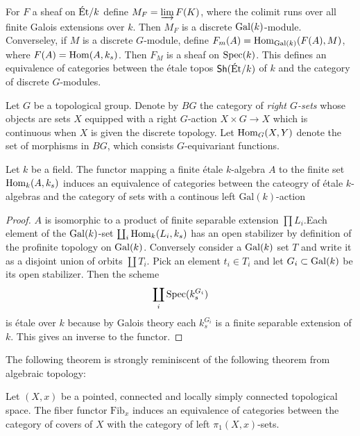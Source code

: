 For $F$ a sheaf on $\text{\'Et}/k$ define $M_F = \varinjlim F(K)$, where the colimit runs over all finite Galois extensions over $k$. Then $M_F$ is a discrete $\operatorname{Gal}(k)$-module. Converseley, if $M$ is a discrete $G$-module, define $F_m(A) = \operatorname{Hom}_{\operatorname{Gal}(k)}(F(A),M)$, where $F(A) = \operatorname{Hom}(A, k_s)$. Then $F_M$ is a sheaf on $\operatorname{Spec}(k)$. This defines an equivalence of categories between the \'etale topos $\operatorname{\mathsf{Sh}}(\text{\'Et}/k)$ of $k$ and the category of discrete $G$-modules.

\begin{construction}
	Let $G$ be a topological group. Denote by $BG$ the category of \textit{right $G$-sets} whose objects are sets $X$ equipped with a right $G$-action $X \times G \to X$ which is continuous when $X$ is given the discrete topology. Let $\operatorname{Hom}_G(X,Y)$ denote the set of morphisms in $BG$, which consists $G$-equivariant functions.
\end{construction}



\begin{definition}

\end{definition}

\begin{theorem}\label{theorem:galois}
	Let $k$ be a field. The functor mapping a finite \'etale $k$-algebra $A$ to the finite set $\operatorname{Hom}_k(A, k_s)$ induces an equivalence of categories between the cateogry of \'etale $k$-algebras and the category of sets with a continous left $\text{Gal}(k)$-action
\end{theorem}

\begin{proof}
	$A$ is isomorphic to a product of finite separable extension $\prod L_i$.Each element of the $\operatorname{Gal}(k)$-set $\coprod_i \operatorname{Hom}_k(L_i, k_s)$ has an open stabilizer by definition of the profinite topology on $\operatorname{Gal}(k)$. Conversely consider a $\operatorname{Gal}(k)$ set $T$ and write it as a disjoint union of orbits $\coprod T_i$. Pick an element $t_i \in T_i$ and let $G_i \subset \operatorname{Gal}(k)$ be its open stabilizer. Then the scheme
	\[
		\coprod_i \operatorname{Spec}(k_s^{G_i})
	\]
	is \'etale over $k$ because by Galois theory each $k_s^{G_i}$ is a finite separable extension of $k$. This gives an inverse to the functor.
\end{proof}

The following theorem is strongly reminiscent of the following theorem from algebraic topology:

\begin{theorem}
	Let $(X,x)$ be a pointed, connected and locally simply connected topological space. The fiber functor $\text{Fib}_x$ induces an equivalence of categories between the category of covers of $X$ with the category of left $\pi_1(X,x)$-sets.
\end{theorem}

